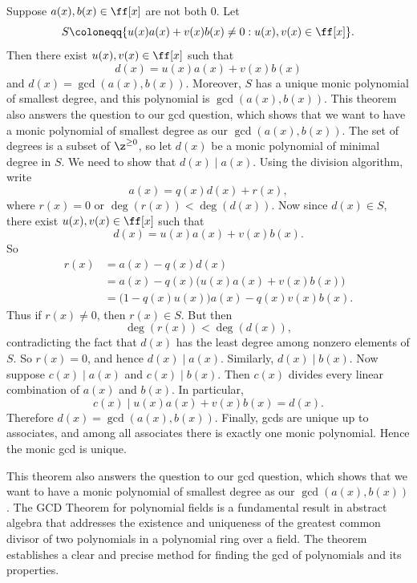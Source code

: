 \begin{theorem}{
    Suppose $a(x),b(x)\in\ff[x]$ are not both $0$.
    Let
    \[
        S\coloneqq \{u(x)a(x)+v(x)b(x)\neq 0 : u(x),v(x)\in\ff[x]\}.
    \]
    Then there exist $u(x),v(x)\in\ff[x]$ such that
    \[
        d(x)=u(x)a(x)+v(x)b(x)
    \]
    and $d(x)=\gcd(a(x),b(x))$.
    Moreover, $S$ has a unique monic polynomial of smallest degree, and this polynomial is $\gcd(a(x),b(x))$.
}
    This theorem also answers the question to our gcd question, which shows that we want to have a monic polynomial of smallest degree as our $\gcd(a(x),b(x))$.
    The set of degrees is a subset of $\z^{\geq 0}$, so let $d(x)$ be a monic polynomial of minimal degree in $S$.
    We need to show that $d(x)\mid a(x)$.
    Using the division algorithm, write
    \[
        a(x)=q(x)d(x)+r(x),
    \]
    where $r(x)=0$ or $\deg(r(x))<\deg(d(x))$.
    Now since $d(x)\in S$, there exist $u(x),v(x)\in\ff[x]$ such that
    \[
        d(x)=u(x)a(x)+v(x)b(x).
    \]
    So
    \begin{align*}
        r(x)
        &=a(x)-q(x)d(x)\\
        &=a(x)-q(x)\bigl(u(x)a(x)+v(x)b(x)\bigr)\\
        &=\bigl(1-q(x)u(x)\bigr)a(x)-q(x)v(x)b(x).
    \end{align*}
    Thus if $r(x)\neq 0$, then $r(x)\in S$.
    But then
    \[
        \deg(r(x))<\deg(d(x)),
    \]
    contradicting the fact that $d(x)$ has the least degree among nonzero elements of $S$.
    So $r(x)=0$, and hence $d(x)\mid a(x)$.
    Similarly, $d(x)\mid b(x)$.
    Now suppose $c(x)\mid a(x)$ and $c(x)\mid b(x)$.
    Then $c(x)$ divides every linear combination of $a(x)$ and $b(x)$.
    In particular,
    \[
        c(x)\mid u(x)a(x)+v(x)b(x)=d(x).
    \]
    Therefore $d(x)=\gcd(a(x),b(x))$.
    Finally, gcds are unique up to associates, and among all associates there is exactly one monic polynomial.
    Hence the monic gcd is unique.
\end{theorem}

This theorem also answers the question to our gcd question, which shows that we want to have a monic polynomial of smallest degree as our $\gcd(a(x),b(x))$.
The GCD Theorem for polynomial fields is a fundamental result in abstract algebra that addresses the existence and uniqueness of the greatest common divisor of two polynomials in a polynomial ring over a field.
The theorem establishes a clear and precise method for finding the gcd of polynomials and its properties.


